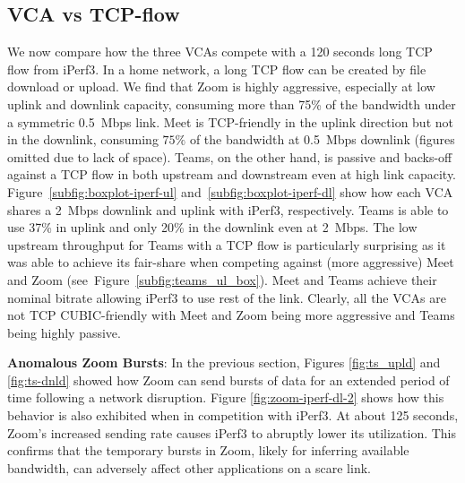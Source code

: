 \subsection{VCA vs TCP-flow}
We now compare how the three VCAs compete with a 120 seconds long TCP flow from iPerf3. In a home network, a long TCP flow can be created by file download or upload. We find that Zoom is highly aggressive,  especially at low uplink and downlink capacity, consuming more than 75\% of the bandwidth under a symmetric 0.5~Mbps link. Meet is TCP-friendly in the uplink direction but not in the downlink, consuming $75\%$ of the bandwidth at 0.5~Mbps downlink (figures omitted due to lack of space). Teams, on the other hand, is passive and backs-off against a TCP flow in both upstream and downstream even at high link capacity. Figure~\ref{subfig:boxplot-iperf-ul} and~\ref{subfig:boxplot-iperf-dl} show how each VCA shares a 2~Mbps downlink and uplink with iPerf3, respectively. Teams is able to use 37\% in uplink and only 20\% in the downlink even at 2~Mbps. The low upstream throughput for Teams with a TCP flow is particularly surprising as it was able to achieve its fair-share when competing against (more aggressive) Meet and Zoom (see~Figure~\ref{subfig:teams_ul_box}). Meet and Teams achieve their nominal bitrate allowing iPerf3 to use rest of the link. Clearly, all the VCAs are not TCP CUBIC-friendly with Meet and Zoom being more aggressive and Teams being highly passive. 


\textbf{Anomalous Zoom Bursts}: In the previous section, Figures \ref{fig:ts_upld} and \ref{fig:ts-dnld} showed how Zoom can send bursts of data for an extended period of time following a network disruption. Figure \ref{fig:zoom-iperf-dl-2} shows how this behavior is also exhibited when in competition with iPerf3. At about 125 seconds, Zoom's increased sending rate causes iPerf3 to abruptly lower its utilization. This confirms that the temporary bursts in Zoom, likely for inferring available bandwidth, can adversely affect other applications on a scare link. 


